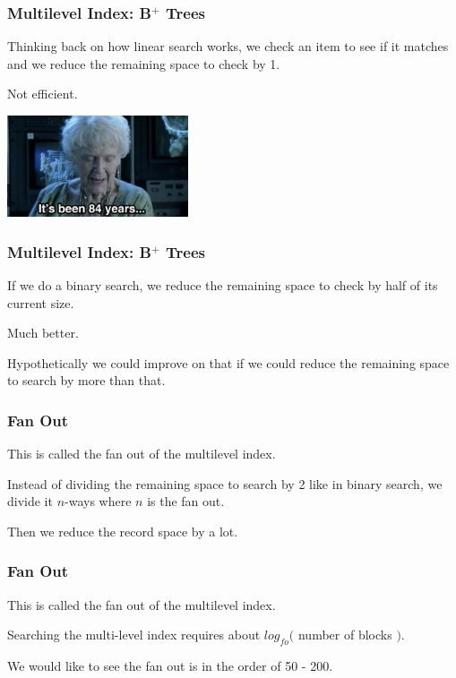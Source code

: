 \begin{frame}
\frametitle{Multilevel Index: B$^{+}$ Trees}

Thinking back on how linear search works, we check an item to see if it matches and we reduce the remaining space to check by 1. 

Not efficient. 

\begin{center}
	\includegraphics[width=0.4\textwidth]{images/84years.jpg}
\end{center}

\end{frame}


\begin{frame}
\frametitle{Multilevel Index: B$^{+}$ Trees}

If we do a binary search, we reduce the remaining space to check by half of its current size. 

Much better. 

Hypothetically we could improve on that if we could reduce the remaining space to search by more than that. 


\end{frame}

\begin{frame}
\frametitle{Fan Out}

This is called the \alert{fan out} of the multilevel index. 

Instead of dividing the remaining space to search by 2 like in binary search, we divide it $n$-ways where $n$ is the fan out. 

Then we reduce the record space by a lot.

\end{frame}

\begin{frame}
\frametitle{Fan Out}

This is called the \alert{fan out} of the multilevel index. 

Searching the multi-level index requires about $log_{fo}($ number of blocks $)$. 

We would like to see the fan out is in the order of 50 - 200.


\end{frame}

